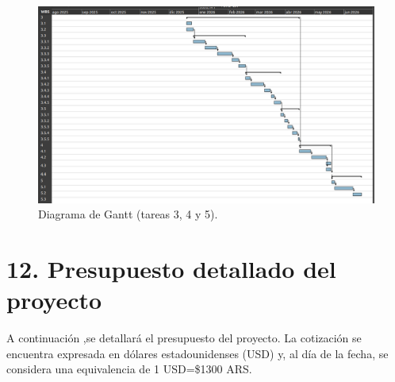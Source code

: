 \documentclass[
11pt, %
]{charter}
\begin{document}
\begin{landscape}
\begin{figure}
\centering 
\includegraphics[scale=0.7]{./Figuras/gantt_2.png}
\caption{Diagrama de Gantt (tareas 3, 4 y 5).}
\label{fig:gantt2}
\end{figure}

\end{landscape}





\section{12. Presupuesto detallado del proyecto}
\label{sec:presupuesto}

A continuación ,se detallará el presupuesto del proyecto. La cotización se encuentra expresada en dólares estadounidenses (USD) y, al día de la fecha, se considera una equivalencia de 1 USD=\$1300 ARS.
\end{document}
